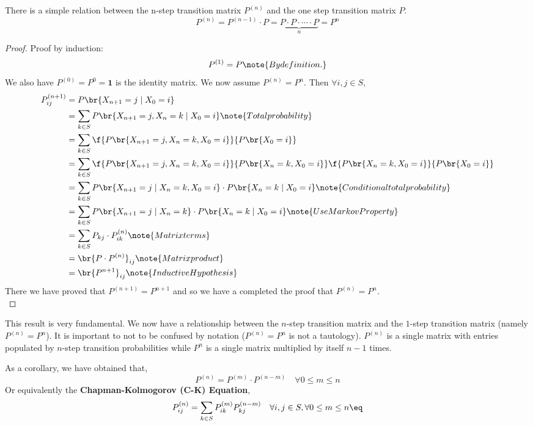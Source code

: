 \documentclass{article}
\newcommand{\ind}{\mathbf{1}}
\begin{document}
\begin{theorem}
There is a simple relation between the n-step transition matrix $P^{(n)}$ and the one step transition matrix $P$.
\[ P^{(n)} = P^{(n-1)} \cdot P = \underbrace{P \cdot P \cdot \cdots \cdot P}_{n} = P^n \]
\end{theorem}

\begin{proof}
Proof by induction:
\[ P^{(1)} = P \note{By definition.} \]
We also have $P^{(0)} = P^{0} = \ind$ is the identity matrix. We now assume $P^{(n)} = P^{n}$. Then $\forall i,j \in S$,
\begin{align*}
    P_{ij}^{(n+1)} &= P\br{X_{n+1} = j \mid X_{0} = i} \\
    &= \sum_{k \in S} P\br{X_{n+1} = j, X_{n} = k \mid X_{0} = i} \note{Total probability}\\
    &= \sum_{k \in S} \f{P\br{X_{n+1} = j, X_{n} = k, X_{0} = i}}{P\br{X_{0} = i}} \\
    &= \sum_{k \in S} \f{P\br{X_{n+1} = j, X_{n} = k, X_{0} = i}}{P\br{X_{n} = k, X_{0} = i}}\f{P\br{X_{n} = k, X_{0} = i}}{P\br{X_{0} = i}} \\
    &= \sum_{k \in S} P\br{X_{n+1} = j \mid X_{n} = k, X_{0} = i} \cdot P\br{X_{n} = k \mid X_{0} = i} \note{Conditional total probability}\\
    &= \sum_{k \in S} P\br{X_{n+1} = j \mid X_{n} = k} \cdot P\br{X_{n} = k \mid X_{0} = i} \note{Use Markov Property}\\
    &= \sum_{k \in S} P_{kj} \cdot P_{ik}^{(n)} \note{Matrix terms}\\
    &= \br{P \cdot P^{(n)}}_{ij} \note{Matrix product}\\
    &= \br{P^{n+1}}_{ij} \note{Inductive Hypothesis}
\end{align*}
There we have proved that $P^{(n+1)} = P^{n+1}$ and so we have a completed the proof that $P^{(n)} = P^{n}$.\\
\end{proof}

This result is very fundamental. We now have a relationship between the $n$-step transition matrix and the $1$-step transition matrix (namely $P^{(n)} = P^n$). It is important to not to be confused by notation ($P^{(n)} = P^n$ is not a tautology). $P^{(n)}$ is a single matrix with entries populated by $n$-step transition probabilities while $P^n$ is a single matrix multiplied by itself $n-1$ times.

\begin{corollary}
As a corollary, we have obtained that,
\[ P^{(n)} = P^{(m)} \cdot P^{(n-m)} \quad \forall 0 \leq m \leq n \]
Or equivalently the \textbf{Chapman-Kolmogorov (C-K) Equation},
\[ P^{(n)}_{ij} = \sum_{k \in S} P^{(m)}_{ik} P^{(n-m)}_{kj} \quad \forall i,j \in S, \forall 0 \leq m \leq n \eq \label{eq:ck_equation} \]
\end{corollary}
\end{document}

